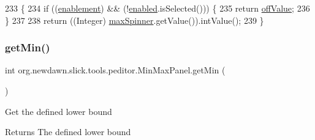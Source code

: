 \begin{DoxyCode}
233                         \{
234         \textcolor{keywordflow}{if} ((\mbox{\hyperlink{classorg_1_1newdawn_1_1slick_1_1tools_1_1peditor_1_1_min_max_panel_a82cdf912c2f081581d288b771c431703}{enablement}}) && (!\mbox{\hyperlink{classorg_1_1newdawn_1_1slick_1_1tools_1_1peditor_1_1_min_max_panel_aff685339c4d9c4cf8009bcfbf2bc72de}{enabled}}.isSelected())) \{
235             \textcolor{keywordflow}{return} \mbox{\hyperlink{classorg_1_1newdawn_1_1slick_1_1tools_1_1peditor_1_1_min_max_panel_a5abd0ceb9a2307cef6de8fbade8039db}{offValue}};
236         \}
237         
238         \textcolor{keywordflow}{return} ((Integer) \mbox{\hyperlink{classorg_1_1newdawn_1_1slick_1_1tools_1_1peditor_1_1_min_max_panel_a9e445c1f2ecd3c64e93ec8bf69f639f9}{maxSpinner}}.getValue()).intValue();
239     \}
\end{DoxyCode}
\mbox{\label{classorg_1_1newdawn_1_1slick_1_1tools_1_1peditor_1_1_min_max_panel_adf479f7a027d743b06f16e54f03f6691}} 
\subsubsection{\texorpdfstring{get\+Min()}{getMin()}}
{\footnotesize\ttfamily int org.\+newdawn.\+slick.\+tools.\+peditor.\+Min\+Max\+Panel.\+get\+Min (\begin{DoxyParamCaption}{ }\end{DoxyParamCaption})\hspace{0.3cm}{\ttfamily [inline]}}

Get the defined lower bound

\begin{DoxyReturn}{Returns}
The defined lower bound 
\end{DoxyReturn}

